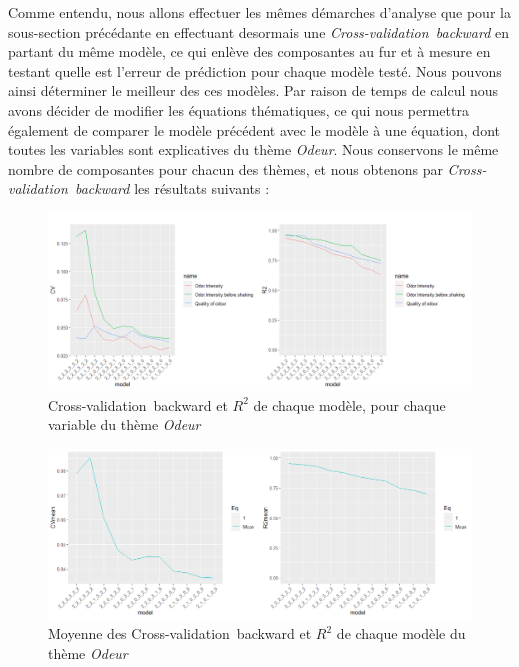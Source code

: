\documentclass[a4paper,french,10pt]{article}
\begin{document}
\bigskip
\bigskip

Comme entendu, nous allons effectuer les mêmes démarches d'analyse que pour la sous-section précédante en effectuant desormais une \textit{Cross-validation~backward} en partant du même modèle, ce qui enlève des composantes au fur et à mesure en testant quelle est l’erreur de prédiction pour chaque modèle testé. Nous pouvons ainsi déterminer le meilleur des ces modèles. Par raison de temps de calcul nous avons décider de modifier les équations thématiques, ce qui nous permettra également de comparer le modèle précédent avec le modèle à une équation, dont toutes les variables sont explicatives du thème \textit{Odeur}. Nous conservons le même nombre de composantes pour chacun des thèmes, et nous obtenons par \textit{Cross-validation~backward} les résultats suivants : 

\begin{figure}[htp] 
	\centering
	\includegraphics[scale=0.52]{images/CV_all.png}
	\caption{Cross-validation~backward et $R^2$ de chaque modèle, pour chaque variable du thème \textit{Odeur}}
\end{figure}

\begin{figure}[htp] 
	\centering
	\includegraphics[scale=0.45]{images/CV_mean.png}
	\caption{Moyenne des Cross-validation~backward et $R^2$ de chaque modèle du thème \textit{Odeur}}
\end{figure}
\end{document}

